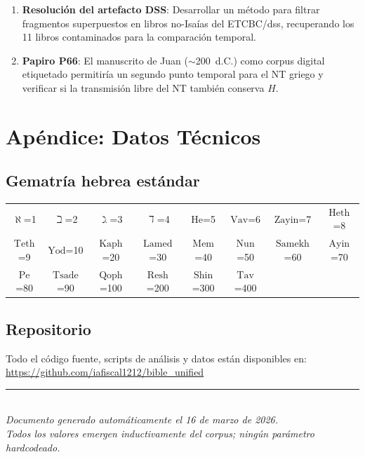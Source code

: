 \documentclass[12pt,a4paper]{article}
\newcommand{\tav}{\mathrm{Tav}}
\newcommand{\shin}{\mathrm{Shin}}
\newcommand{\resh}{\mathrm{Resh}}
\newcommand{\qoph}{\mathrm{Qoph}}
\newcommand{\tsade}{\mathrm{Tsade}}
\newcommand{\pe}{\mathrm{Pe}}
\newcommand{\ayin}{\mathrm{Ayin}}
\newcommand{\samekh}{\mathrm{Samekh}}
\newcommand{\nun}{\mathrm{Nun}}
\newcommand{\mem}{\mathrm{Mem}}
\newcommand{\lamed}{\mathrm{Lamed}}
\newcommand{\kaph}{\mathrm{Kaph}}
\newcommand{\yod}{\mathrm{Yod}}
\newcommand{\teth}{\mathrm{Teth}}
\newcommand{\heth}{\mathrm{Heth}}
\newcommand{\zayin}{\mathrm{Zayin}}
\newcommand{\vav}{\mathrm{Vav}}
\newcommand{\he}{\mathrm{He}}
\begin{document}
\begin{enumerate}[leftmargin=2em]
\item \textbf{Resoluci\'on del artefacto DSS}: Desarrollar un m\'etodo para filtrar
      fragmentos superpuestos en libros no-Isa\'ias del ETCBC/dss, recuperando
      los 11 libros contaminados para la comparaci\'on temporal.

\item \textbf{Papiro P66}: El manuscrito de Juan ($\sim$200~d.C.) como corpus
      digital etiquetado permitir\'ia un segundo punto temporal para el NT griego
      y verificar si la transmisi\'on libre del NT tambi\'en conserva $H$.

\end{enumerate}


\section{Ap\'endice: Datos T\'ecnicos}

\subsection{Gematr\'ia hebrea est\'andar}

\begin{center}\small
\begin{tabular}{cccccccc}
\toprule
$\aleph$=1 & $\beth$=2 & $\gimel$=3 & $\daleth$=4 & $\he$=5 &
$\vav$=6 & $\zayin$=7 & $\heth$=8 \\
$\teth$=9 & $\yod$=10 & $\kaph$=20 & $\lamed$=30 & $\mem$=40 & $\nun$=50 &
$\samekh$=60 & $\ayin$=70 \\
$\pe$=80 & $\tsade$=90 & $\qoph$=100 & $\resh$=200 & $\shin$=300 & $\tav$=400 & & \\
\bottomrule
\end{tabular}
\end{center}

\subsection{Repositorio}

Todo el c\'odigo fuente, scripts de an\'alisis y datos est\'an disponibles en:\\
\url{https://github.com/iafiscal1212/bible_unified}

\vspace{1cm}
\begin{center}
\rule{4cm}{0.4pt}\\[0.5em]
\textit{Documento generado autom\'aticamente el 16 de marzo de 2026.}\\
\textit{Todos los valores emergen inductivamente del corpus; ning\'un par\'ametro hardcodeado.}
\end{center}
\end{document}
